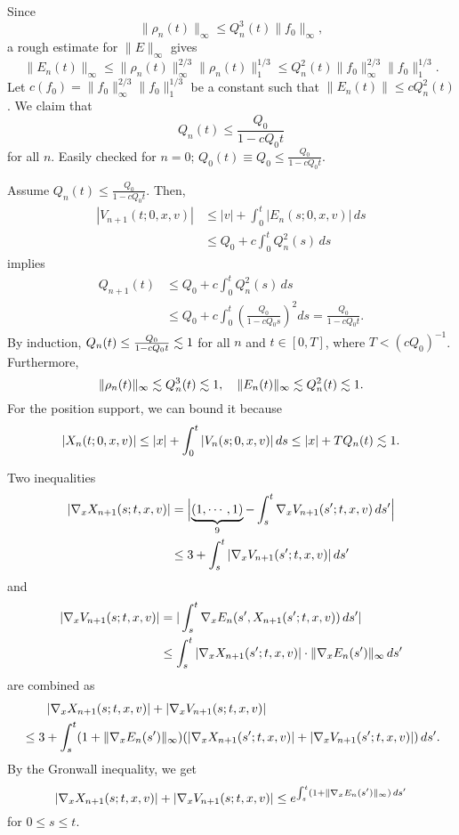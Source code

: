 \documentclass[11pt]{amsart}
\begin{document}
\begin{pfs}
\item
Since
\[\|\rho_n(t)\|_\infty\le Q_n^3(t)\|f_0\|_\infty,\]
a rough estimate for $\|E\|_\infty$ gives
\[\|E_n(t)\|_\infty\le\|\rho_n(t)\|_\infty^{2/3}\|\rho_n(t)\|_1^{1/3}\le Q_n^2(t)\|f_0\|_\infty^{2/3}\|f_0\|_1^{1/3}.\]
Let $c(f_0)=\|f_0\|_\infty^{2/3}\|f_0\|_1^{1/3}$ be a constant such that $\|E_n(t)\|\le cQ_n^2(t)$.
We claim that
\[Q_n(t)\le\frac{Q_0}{1-cQ_0t}\]
for all $n$.
Easily checked for $n=0$; $Q_0(t)\equiv Q_0\le\frac{Q_0}{1-cQ_0t}$.

Assume $Q_n(t)\le\frac{Q_0}{1-cQ_0t}$.
Then,
\begin{align*}
|V_{n+1}(t;0,x,v)|
&\le|v|+\int_0^t|E_n(s;0,x,v)|\,ds\\
&\le Q_0+c\int_0^tQ_n^2(s)\,ds
\end{align*}
implies
\begin{align*}
Q_{n+1}(t)
&\le Q_0+c\int_0^tQ_n^2(s)\,ds\\
&\le Q_0+c\int_0^t\left(\frac{Q_0}{1-cQ_0s}\right)^2ds
=\frac{Q_0}{1-cQ_0t}.
\end{align*}
By induction, $Q_n(t)\le\frac{Q_0}{1-cQ_0t}\lesssim1$ for all $n$ and $t\in[0,T]$, where $T<(cQ_0)^{-1}$.
Furthermore,
\[\|\rho_n(t)\|_\infty\lesssim Q_n^3(t)\lesssim1,\quad\|E_n(t)\|_\infty\lesssim Q_n^2(t)\lesssim1.\]
For the position support, we can bound it because
\[|X_n(t;0,x,v)|\le|x|+\int_0^t|V_n(s;0,x,v)|\,ds\le|x|+TQ_n(t)\lesssim1.\]

\item
Two inequalities
\begin{align*}
|\nabla_xX_{n+1}(s;t,x,v)|
&=\Bigl|\underbrace{(1,\cdots,1)}_{9}-\int_s^t\nabla_xV_{n+1}(s';t,x,v)\,ds'\Bigr|\\
&\le3+\int_s^t|\nabla_xV_{n+1}(s';t,x,v)|\,ds'
\end{align*}
and
\begin{align*}
|\nabla_xV_{n+1}(s;t,x,v)|
&=|\int_s^t\nabla_xE_n(s',X_{n+1}(s';t,x,v))\,ds'|\\
&\le\int_s^t|\nabla_xX_{n+1}(s';t,x,v)|\cdot\|\nabla_xE_n(s')\|_\infty\,ds'
\end{align*}
are combined as
\begin{align*}
&\qquad|\nabla_xX_{n+1}(s;t,x,v)|+|\nabla_xV_{n+1}(s;t,x,v)|\\
&\le3+\int_s^t(1+\|\nabla_xE_n(s')\|_\infty)(|\nabla_xX_{n+1}(s';t,x,v)|+|\nabla_xV_{n+1}(s';t,x,v)|)\,ds'.
\end{align*}
By the Gronwall inequality, we get
\[|\nabla_xX_{n+1}(s;t,x,v)|+|\nabla_xV_{n+1}(s;t,x,v)|\le e^{\int_s^t(1+\|\nabla_xE_n(s')\|_\infty)\,ds'}\]
for $0\le s\le t$.


\end{pfs}
\end{document}
